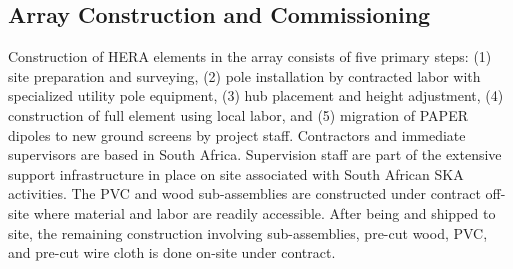 \documentclass[preprint]{aastex}
\begin{document}
\vspace{-0.25in}
\subsection{Array Construction and Commissioning}
\vspace{-6pt}

Construction of HERA elements in the array consists of five primary steps: 
(1) site preparation and surveying, (2) pole installation by contracted labor with specialized utility pole equipment,
(3) hub placement and height adjustment, (4) construction of full element using local labor,
and (5) migration of PAPER dipoles to new ground screens by project staff.
Contractors and immediate supervisors are based in South Africa.  Supervision staff 
are part of the extensive support infrastructure in place on site associated with South African SKA activities.
The PVC and wood sub-assemblies 
are constructed under contract off-site where material and labor are readily accessible.  After being and shipped to site, the
remaining construction involving sub-assemblies, pre-cut wood, PVC, and pre-cut wire cloth 
is done on-site under contract.  


\end{document}
